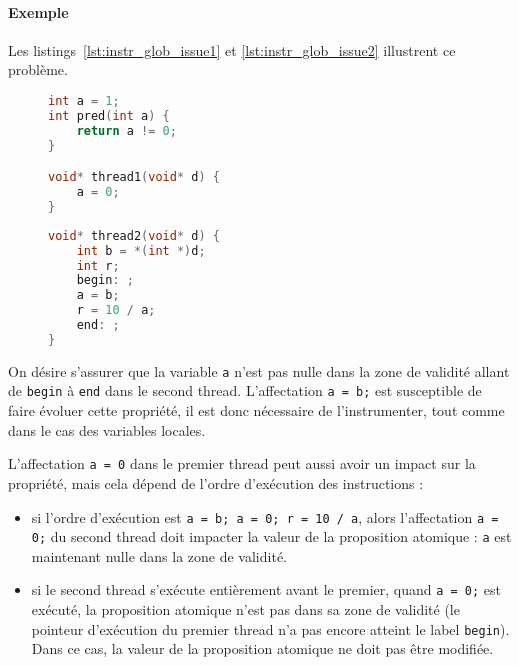\paragraph{Exemple}
Les listings~\ref{lst:instr_glob_issue1} et \ref{lst:instr_glob_issue2}
illustrent ce problème.

\begin{figure}
\noindent\begin{minipage}{.45\textwidth}
\begin{lstlisting}[language=C, frame=single, caption=Thread 1,
  label=lst:instr_glob_issue1]
int a = 1;
int pred(int a) {
    return a != 0;
}

void* thread1(void* d) {
    a = 0;
}
\end{lstlisting}
\end{minipage}\hfill
\begin{minipage}{.45\textwidth}
\begin{lstlisting}[language=C, frame=single, caption=Thread 2,
  label=lst:instr_glob_issue2]
void* thread2(void* d) {
    int b = *(int *)d;
    int r;
    begin: ;
    a = b;
    r = 10 / a;
    end: ;
}
\end{lstlisting}
\end{minipage}
\end{figure}

On désire s'assurer que la variable \texttt{a} n'est pas nulle dans
la zone de validité allant de \texttt{begin} à \texttt{end} dans
le second thread. L'affectation \texttt{a = b;} est susceptible de
faire évoluer cette propriété, il est donc nécessaire de l'instrumenter,
tout comme dans le cas des variables locales.

L'affectation \texttt{a = 0} dans le premier thread peut aussi avoir
un impact sur la propriété, mais cela dépend de l'ordre d'exécution des
instructions :

\begin{itemize}
\item
  si l'ordre d'exécution est \texttt{a = b; a = 0; r = 10 / a}, alors
  l'affectation \texttt{a = 0;} du second thread doit impacter la
  valeur de la proposition atomique : \texttt{a} est maintenant nulle
  dans la zone de validité.
\item
  si le second thread s'exécute entièrement avant le premier, quand
  \texttt{a = 0;} est exécuté, la proposition atomique n'est pas dans
  sa zone de validité (le pointeur d'exécution du premier thread n'a pas
  encore atteint le label \texttt{begin}). Dans ce cas, la valeur de
  la proposition atomique ne doit pas être modifiée.
\end{itemize}


